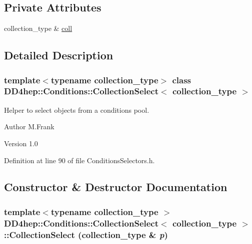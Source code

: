 \subsection*{Private Attributes}
\begin{DoxyCompactItemize}
\item 
collection\_\-type \& \hyperlink{class_d_d4hep_1_1_conditions_1_1_collection_select_add9428a8c7577a9d09c7148c4ba1fcd9}{coll}
\end{DoxyCompactItemize}


\subsection{Detailed Description}
\subsubsection*{template$<$typename collection\_\-type$>$ class DD4hep::Conditions::CollectionSelect$<$ collection\_\-type $>$}

Helper to select objects from a conditions pool. \begin{DoxyAuthor}{Author}
M.Frank 
\end{DoxyAuthor}
\begin{DoxyVersion}{Version}
1.0 
\end{DoxyVersion}


Definition at line 90 of file ConditionsSelectors.h.

\subsection{Constructor \& Destructor Documentation}
\hypertarget{class_d_d4hep_1_1_conditions_1_1_collection_select_a879f557b25aae1cd0608484eb0524929}{
\subsubsection[{CollectionSelect}]{\setlength{\rightskip}{0pt plus 5cm}template$<$typename collection\_\-type $>$ {\bf DD4hep::Conditions::CollectionSelect}$<$ collection\_\-type $>$::{\bf CollectionSelect} (collection\_\-type \& {\em p})}}
\label{class_d_d4hep_1_1_conditions_1_1_collection_select_a879f557b25aae1cd0608484eb0524929}


